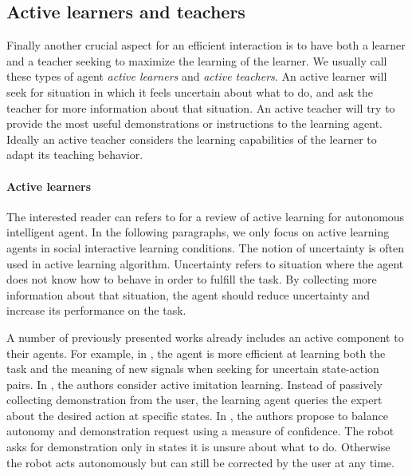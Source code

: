 \subsection{Active learners and teachers}

Finally another crucial aspect for an efficient interaction is to have both a learner and a teacher seeking to maximize the learning of the learner. We usually call these types of agent \emph{active learners} and \emph{active teachers}. An active learner will seek for situation in which it feels uncertain about what to do, and ask the teacher for more information about that situation. An active teacher will try to provide the most useful demonstrations or instructions to the learning agent. Ideally an active teacher considers the learning capabilities of the learner to adapt its teaching behavior. 

\paragraph{Active learners} 

The interested reader can refers to \cite{lopes2014active} for a review of active learning for autonomous intelligent agent. In the following paragraphs, we only focus on active learning agents in social interactive learning conditions. The notion of uncertainty is often used in active learning algorithm. Uncertainty refers to situation where the agent does not know how to behave in order to fulfill the task. By collecting more information about that situation, the agent should reduce uncertainty and increase its performance on the task.

A number of previously presented works already includes an active component to their agents. For example, in \cite{macl11simul}, the agent is more efficient at learning both the task and the meaning of new signals when seeking for uncertain state-action pairs. In \cite{judah2012active}, the authors consider active imitation learning. Instead of passively collecting demonstration from the user, the learning agent queries the expert about the desired action at specific states. In \cite{chernova09jair}, the authors propose to balance autonomy and demonstration request using a measure of confidence. The robot asks for demonstration only in states it is unsure about what to do. Otherwise the robot acts autonomously but can still be corrected by the user at any time.





